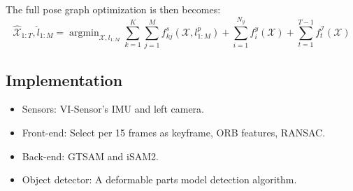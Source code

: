 \documentclass[12pt]{article}
\DeclareMathOperator*{\argmin}{argmin} %
\numberwithin{equation}{section}
\begin{document}
The full pose graph optimization is then becomes: 
	\begin{equation}
			\hat{\mathcal{X}}_{1:T}, \hat{l}_{1:M}=\argmin_{\mathcal{X}, l_{1:M}} \sum^K_{k=1} \sum^M_{j=1}f^s_{kj}(\mathcal{X}, l^p_{1:M}) + \sum^{N_y}_{i=1} f^y_i(\mathcal{X}) + \sum^{T-1}_{t=1} f^{\mathcal{I}}_t(\mathcal{X})
	\end{equation}
\subsection{Implementation}
\begin{itemize}
	\item Sensors: VI-Sensor's IMU and left camera.
	\item Front-end: Select per 15 frames as keyframe, ORB features, RANSAC.
	\item Back-end: GTSAM and iSAM2.
	\item Object detector: A deformable parts model detection algorithm.  
\end{itemize}
\renewcommand\refname{Reference}

 
\clearpage
\end{document}
